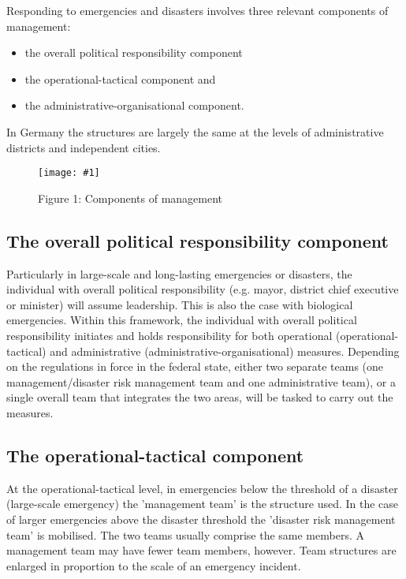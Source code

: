 \documentclass{article}
\newlength{\imgwidth}
\newcommand\scaledgraphics[2]{%
                
\settowidth{\imgwidth}{\texttt{[image: \#1]}}%
                
\setlength{\imgwidth}{\minof{\imgwidth}{#2\textwidth}}%
                
\texttt{[image: \#1]}%
                
}
\begin{document}
Responding to emergencies and disasters involves three relevant components of management:

\begin{itemize}
\item the overall political responsibility component


\item the operational-tactical component and


\item the administrative-organisational component.


\end{itemize}

In Germany the structures are largely the same at the levels of administrative districts and independent cities.

\begin{figure}
\scaledgraphics{3664e5be-a2b9-4171-afee-fa6cd0086a2d.png}{1}
\caption*{Figure 1: Components of management}\label{F74305891}
\end{figure}





\subsection{The overall political responsibility component}\label{H8828834}



Particularly in large-scale and long-lasting emergencies or disasters, the individual with overall political responsibility (e.g. mayor, district chief executive or minister) will assume leadership. This is also the case with biological emergencies. Within this framework, the individual with overall political responsibility initiates and holds responsibility for both operational (operational-tactical) and administrative (administrative-organisational) measures. Depending on the regulations in force in the federal state, either two separate teams (one management/disaster risk management team and one administrative team), or a single overall team that integrates the two areas, will be tasked to carry out the measures.


\subsection{The operational-tactical component}\label{H4117067}



At the operational-tactical level, in emergencies below the threshold of a disaster (large-scale emergency) the 'management team' is the structure used. In the case of larger emergencies above the disaster threshold the 'disaster risk management team' is mobilised. The two teams usually comprise the same members. A management team may have fewer team members, however. Team structures are enlarged in proportion to the scale of an emergency incident.
\end{document}
